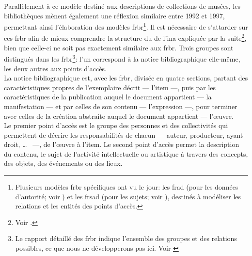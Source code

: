 Parallèlement à ce modèle destiné aux descriptions de collections de musées, les bibliothèques mènent également une réflexion similaire entre 1992 et 1997, permettant ainsi l'élaboration des modèles \ac{frbr}\footnote{Plusieurs modèles \ac{frbr} spécifiques ont vu le jour: les \ac{frad} (pour les données d'autorité; voir \cite{federation_internationale_des_associations_de_bibliothecaires_et_de_bibliotheques_fonctionnalites_2010}) et les \ac{frsad} (pour les sujets; voir \cite{federation_internationale_des_associations_de_bibliothecaires_et_de_bibliotheques_fonctionnalites_2010-1}), destinés à modéliser les relations et les entités des points d'accès.}. 
Il est nécessaire de s'attarder sur ces \ac{frbr} afin de mieux comprendre la structure du \ldd de l'\ac{ina} expliquée par la suite\footnote{Voir .}, bien que celle-ci ne soit pas exactement similaire aux \ac{frbr}.
Trois groupes sont distingués dans les \ac{frbr}\footnote{Le rapport détaillé des \ac{frbr} indique l'ensemble des groupes et des relations possibles, ce que nous ne développerons pas ici. Voir \cite{federation_internationale_des_associations_de_bibliothecaires_et_de_bibliotheques_fonctionnalites_2012}}: l'un correspond à la notice bibliographique elle-même, les deux autres aux points d'accès.\\

La notice bibliographique est, avec les \ac{frbr}, divisée en quatre sections, partant des caractéristiques propres de l'exemplaire décrit --- l'item ---, puis par les caractéristiques de la publication auquel le document appartient --- la manifestation --- et par celles de son contenu --- l'expression ---, pour terminer avec celles de la création abstraite auquel le document appartient --- l'œuvre.\\

Le premier point d'accès est le groupe des personnes et des collectivités qui permettent de décrire les responsabilités de chacun --- auteur, producteur, ayant-droit, \dots ~ ---, de l'œuvre à l'item. Le second point d'accès permet la description du contenu, le sujet de l'activité intellectuelle ou artistique à travers des concepts, des objets, des événements ou des lieux.\\

